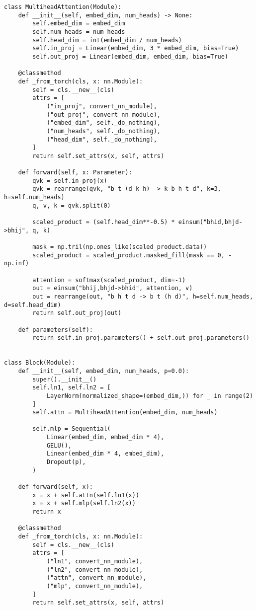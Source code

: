 \documentclass[11pt]{article}
\begin{document}
\begin{verbatim}
class MultiheadAttention(Module):
    def __init__(self, embed_dim, num_heads) -> None:
        self.embed_dim = embed_dim
        self.num_heads = num_heads
        self.head_dim = int(embed_dim / num_heads)
        self.in_proj = Linear(embed_dim, 3 * embed_dim, bias=True)
        self.out_proj = Linear(embed_dim, embed_dim, bias=True)

    @classmethod
    def _from_torch(cls, x: nn.Module):
        self = cls.__new__(cls)
        attrs = [
            ("in_proj", convert_nn_module),
            ("out_proj", convert_nn_module),
            ("embed_dim", self._do_nothing),
            ("num_heads", self._do_nothing),
            ("head_dim", self._do_nothing),
        ]
        return self.set_attrs(x, self, attrs)

    def forward(self, x: Parameter):
        qvk = self.in_proj(x)
        qvk = rearrange(qvk, "b t (d k h) -> k b h t d", k=3, h=self.num_heads)
        q, v, k = qvk.split(0)

        scaled_product = (self.head_dim**-0.5) * einsum("bhid,bhjd->bhij", q, k)

        mask = np.tril(np.ones_like(scaled_product.data))
        scaled_product = scaled_product.masked_fill(mask == 0, -np.inf)

        attention = softmax(scaled_product, dim=-1)
        out = einsum("bhij,bhjd->bhid", attention, v)
        out = rearrange(out, "b h t d -> b t (h d)", h=self.num_heads, d=self.head_dim)
        return self.out_proj(out)

    def parameters(self):
        return self.in_proj.parameters() + self.out_proj.parameters()


class Block(Module):
    def __init__(self, embed_dim, num_heads, p=0.0):
        super().__init__()
        self.ln1, self.ln2 = [
            LayerNorm(normalized_shape=(embed_dim,)) for _ in range(2)
        ]
        self.attn = MultiheadAttention(embed_dim, num_heads)

        self.mlp = Sequential(
            Linear(embed_dim, embed_dim * 4),
            GELU(),
            Linear(embed_dim * 4, embed_dim),
            Dropout(p),
        )

    def forward(self, x):
        x = x + self.attn(self.ln1(x))
        x = x + self.mlp(self.ln2(x))
        return x

    @classmethod
    def _from_torch(cls, x: nn.Module):
        self = cls.__new__(cls)
        attrs = [
            ("ln1", convert_nn_module),
            ("ln2", convert_nn_module),
            ("attn", convert_nn_module),
            ("mlp", convert_nn_module),
        ]
        return self.set_attrs(x, self, attrs)


\end{verbatim}
\end{document}
